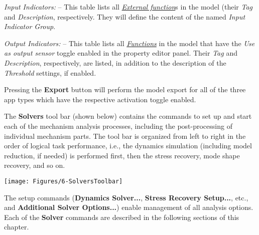 \begin{bulletlist}
\item{\sl Input Indicators:} --
  This table lists all
  \protect\hyperlink{external-function}{\sl External function}s in the model
  (their {\sl Tag} and {\sl Description}, respectively.
  They will define the content of the named {\sl Input Indicator Group}.

\item{\sl Output Indicators:} --
  This table lists all \protect\hyperlink{functions}{\sl Functions} in the model
  that have the {\sl Use as output sensor} toggle enabled in the property editor
  panel. Their {\sl Tag} and {\sl Description}, respectively, are listed,
  in addition to the description of the {\sl Threshold} settings, if enabled.
\end{bulletlist}

Pressing the \textbf{Export} button will perform the model export for all of the
three app types which have the respective activation toggle enabled.



The \textbf{Solvers} tool bar (shown below) contains the commands to set up and
start each of the mechanism analysis processes, including the post-processing
of individual mechanism parts. The tool bar is organized from left to right
in the order of logical task performance, i.e., the dynamics simulation
(including model reduction, if needed) is performed first,
then the stress recovery, mode shape recovery, and so on.

\begin{center}
  \texttt{[image: Figures/6-SolversToolbar]}
\end{center}

The setup commands (\textbf{Dynamics Solver...}, \textbf{Stress Recovery
Setup...}, etc., and \textbf{Additional Solver Options...}) enable management
of all analysis options. Each of the \textbf{Solver} commands are described
in the following sections of this chapter.





